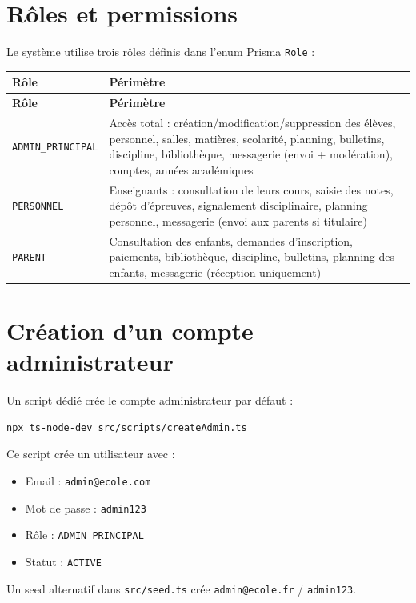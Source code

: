 \documentclass[12pt,a4paper]{report}
\begin{document}
\section{Rôles et permissions}

Le système utilise trois rôles définis dans l'enum Prisma \texttt{Role} :

\begin{longtable}{|p{3.5cm}|p{11cm}|}
\hline
\textbf{Rôle} & \textbf{Périmètre} \\
\hline
\endfirsthead
\hline
\textbf{Rôle} & \textbf{Périmètre} \\
\hline
\endhead
\texttt{ADMIN\_PRINCIPAL} & Accès total : création/modification/suppression des élèves, personnel, salles, matières, scolarité, planning, bulletins, discipline, bibliothèque, messagerie (envoi + modération), comptes, années académiques \\
\hline
\texttt{PERSONNEL} & Enseignants : consultation de leurs cours, saisie des notes, dépôt d'épreuves, signalement disciplinaire, planning personnel, messagerie (envoi aux parents si titulaire) \\
\hline
\texttt{PARENT} & Consultation des enfants, demandes d'inscription, paiements, bibliothèque, discipline, bulletins, planning des enfants, messagerie (réception uniquement) \\
\hline
\end{longtable}

\section{Création d'un compte administrateur}

Un script dédié crée le compte administrateur par défaut :
\begin{lstlisting}
npx ts-node-dev src/scripts/createAdmin.ts
\end{lstlisting}

Ce script crée un utilisateur avec :
\begin{itemize}
    \item Email : \texttt{admin@ecole.com}
    \item Mot de passe : \texttt{admin123}
    \item Rôle : \texttt{ADMIN\_PRINCIPAL}
    \item Statut : \texttt{ACTIVE}
\end{itemize}

Un seed alternatif dans \texttt{src/seed.ts} crée \texttt{admin@ecole.fr} / \texttt{admin123}.
\end{document}
